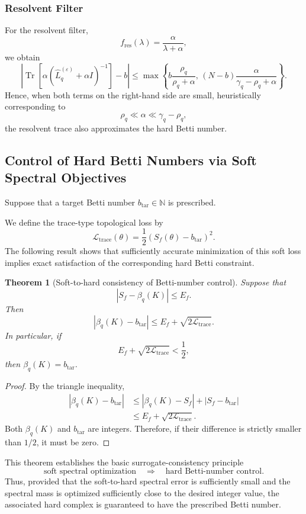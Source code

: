 \documentclass[pdflatex,sn-mathphys-num]{sn-jnl}%
\theoremstyle{thmstyleone}%
\newtheorem{theorem}{Theorem}%
\theoremstyle{thmstyletwo}%
\theoremstyle{thmstylethree}%
\begin{document}
\subsubsection{Resolvent Filter}

For the resolvent filter,
\[
f_{\mathrm{res}}(\lambda)
=
\frac{\alpha}{\lambda+\alpha},
\]
we obtain
\[
\left|
\operatorname{Tr}
\left[
\alpha
\left(
\widehat L_q^{(\varepsilon)}
+
\alpha I
\right)^{-1}
\right]
-
b
\right|
\le
\max
\left\{
b\frac{\rho_q}{\rho_q+\alpha},
\,
(N-b)
\frac{\alpha}
{\gamma_q-\rho_q+\alpha}
\right\}.\]
Hence, when both terms on the right-hand side are small, heuristically corresponding to
\[
\rho_q
\ll
\alpha
\ll
\gamma_q-\rho_q,
\]
the resolvent trace also approximates the hard Betti number.


\subsection{Control of Hard Betti Numbers via Soft Spectral Objectives}

Suppose that a target Betti number $b_{\mathrm{tar}}\in\mathbb N$
is prescribed.

We define the trace-type topological loss by
\[
\mathcal L_{\mathrm{trace}}(\theta)
=
\frac12
\left(
S_f(\theta)-b_{\mathrm{tar}}
\right)^2.
\]
The following result shows that sufficiently accurate minimization of this soft loss implies exact satisfaction of the corresponding hard Betti constraint.

\begin{theorem}[Soft-to-hard consistency of Betti-number control]
Suppose that
\[
\left|
S_f-\beta_q(K)
\right|
\le
E_f.
\]
Then
\[
\left|
\beta_q(K)-b_{\mathrm{tar}}
\right|
\le
E_f
+
\sqrt{
2\mathcal L_{\mathrm{trace}}
}.
\]
In particular, if
\[
E_f
+
\sqrt{
2\mathcal L_{\mathrm{trace}}
}
<
\frac12,
\]
then $\beta_q(K)=b_{\mathrm{tar}}$.
\end{theorem}

\begin{proof}
By the triangle inequality,
\[
\begin{aligned}
\left|
\beta_q(K)-b_{\mathrm{tar}}
\right|
&\le
\left|
\beta_q(K)-S_f
\right|
+
\left|
S_f-b_{\mathrm{tar}}
\right|
\\
&\le
E_f
+
\sqrt{
2\mathcal L_{\mathrm{trace}}
}.
\end{aligned}
\]
Both
\(\beta_q(K)\) and \(b_{\mathrm{tar}}\) are integers. Therefore, if their difference is strictly smaller than \(1/2\), it must be zero.
\end{proof}
This theorem establishes the basic surrogate-consistency principle
\[
\boxed{
\text{soft spectral optimization}
\quad\Longrightarrow\quad
\text{hard Betti-number control}.
}
\]
Thus, provided that the soft-to-hard spectral error is sufficiently small and the spectral mass is optimized sufficiently close to the desired integer value, the associated hard complex is guaranteed to have the prescribed Betti number.
\end{document}
